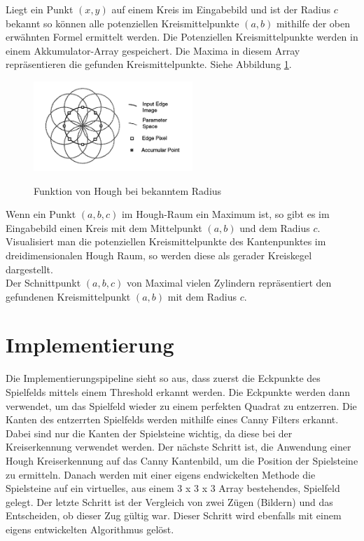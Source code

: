 \documentclass[paper=A4, deutsch]{scrartcl}
\begin{document}
Liegt ein Punkt \((x,y)\) auf einem Kreis im Eingabebild und ist der Radius \(c\) bekannt so k\"onnen alle potenziellen Kreismittelpunkte \((a,b)\) mithilfe der oben erwähnten Formel ermittelt werden. Die Potenziellen Kreismittelpunkte werden in einem Akkumulator-Array gespeichert. Die Maxima in diesem Array repräsentieren die gefunden Kreismittelpunkte.\cite{houghnote2} Siehe Abbildung \ref{fig:hough2d}.\\

\begin{figure}[ht]
	\centering
		\includegraphics[width=6cm]{2dhough_darstellung.png}\\
	\caption[Funktion von Hough bei bekanntem Radius]{Funktion von Hough bei bekanntem Radius\cite{houghnote2}}
	\label{fig:hough2d}
\end{figure}

Wenn ein Punkt \((a,b,c)\) im Hough-Raum ein Maximum ist, so gibt es im Eingabebild einen Kreis mit dem Mittelpunkt \((a,b)\) und dem Radius  \(c\).
Visualisiert man die potenziellen Kreismittelpunkte des Kantenpunktes im dreidimensionalen Hough Raum, so werden diese als gerader Kreiskegel dargestellt.\cite{houghnote1}\\ Der Schnittpunkt \((a,b,c)\) von Maximal vielen Zylindern repräsentiert den gefundenen Kreismittelpunkt \((a,b)\) mit dem Radius \( c\).


\section{Implementierung}
Die Implementierungspipeline sieht so aus, dass zuerst die Eckpunkte des Spielfelds mittels  einem Threshold erkannt werden. Die Eckpunkte werden dann verwendet, um das Spielfeld wieder zu einem perfekten Quadrat zu entzerren. Die Kanten des entzerrten Spielfelds werden mithilfe eines Canny Filters erkannt. Dabei sind nur die Kanten der Spielsteine wichtig, da diese bei der Kreiserkennung verwendet werden. Der nächste Schritt ist, die Anwendung einer Hough Kreiserkennung auf das Canny Kantenbild, um die Position der Spielsteine zu ermitteln. Danach werden mit einer eigens endwickelten Methode die Spielsteine auf ein virtuelles, aus einem 3 x 3 x 3 Array bestehendes, Spielfeld gelegt. Der letzte Schritt ist der Vergleich von zwei Zügen (Bildern) und das Entscheiden, ob dieser Zug gültig war. Dieser Schritt wird ebenfalls mit einem eigens entwickelten Algorithmus gelöst.
\end{document}
